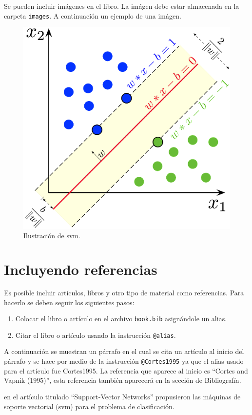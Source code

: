 \documentclass[
]{krantz}
\providecommand{\tightlist}{%
  \setlength{\itemsep}{0pt}\setlength{\parskip}{0pt}}
\begin{document}
Se pueden incluir imágenes en el libro. La imágen debe estar almacenada en la carpeta \texttt{images}. A continuación un ejemplo de una imágen.

\begin{figure}

{\centering \includegraphics[width=0.6\linewidth]{images/svm} 

}

\caption{Ilustración de svm.}\label{fig:rmarkdown}
\end{figure}

\hypertarget{referencias}{%
\chapter{Incluyendo referencias}\label{referencias}}

Es posible incluir artículos, libros y otro tipo de material como referencias. Para hacerlo se deben seguir los siguientes pasos:

\begin{enumerate}
\def\labelenumi{\arabic{enumi}.}
\tightlist
\item
  Colocar el libro o artículo en el archivo \texttt{book.bib} asignándole un alias.
\item
  Citar el libro o artículo usando la instrucción \texttt{@alias}.
\end{enumerate}

A continuación se muestran un párrafo en el cual se cita un artículo al inicio del párrafo y se hace por medio de la instrucción \texttt{@Cortes1995} ya que el alias usado para el artículo fue Cortes1995. La referencia que aparece al inicio es ``Cortes and Vapnik (1995)'', esta referencia también aparecerá en la sección de Bibliografía.

\citet{Cortes1995} en el artículo titulado ``Support-Vector Networks'' propusieron las máquinas de soporte vectorial (svm) para el problema de clasificación.
\end{document}
